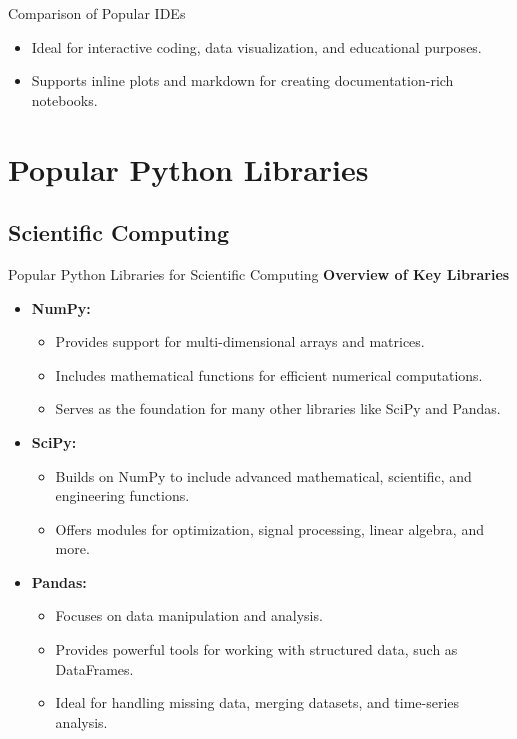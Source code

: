 \documentclass[10pt]{beamer}
\let\olditem\item
\renewcommand\item{\olditem\justifying}
\begin{document}
\begin{frame}{Comparison of Popular IDEs}
\begin{adjustbox}{scale=.9}
\begin{minipage}{1.11\linewidth}
\begin{itemize}
			\begin{itemize}
				\item Ideal for interactive coding, data visualization, and educational purposes.
				\item Supports inline plots and markdown for creating documentation-rich notebooks.
			\end{itemize}
		\end{itemize}
		\end{minipage}
		\end{adjustbox}
	\end{frame}
	
	
	\section{Popular Python Libraries}
	\subsection{Scientific Computing}
	\begin{frame}{Popular Python Libraries for Scientific Computing}
		\textbf{Overview of Key Libraries}
		\begin{itemize}
			\item \textbf{NumPy:}
			\begin{itemize}
				\item Provides support for multi-dimensional arrays and matrices.
				\item Includes mathematical functions for efficient numerical computations.
				\item Serves as the foundation for many other libraries like SciPy and Pandas.
			\end{itemize}
			\item \textbf{SciPy:}
			\begin{itemize}
				\item Builds on NumPy to include advanced mathematical, scientific, and engineering functions.
				\item Offers modules for optimization, signal processing, linear algebra, and more.
			\end{itemize}
			\item \textbf{Pandas:}
			\begin{itemize}
				\item Focuses on data manipulation and analysis.
				\item Provides powerful tools for working with structured data, such as DataFrames.
				\item Ideal for handling missing data, merging datasets, and time-series analysis.
			\end{itemize}
		\end{itemize}
		

	\end{frame}
	
\end{document}
